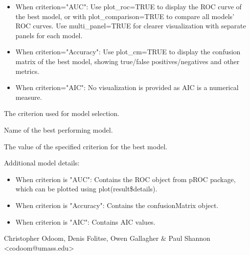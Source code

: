 \documentclass[a4paper]{book}
\begin{document}
\begin{Details}
\begin{itemize}
\item{} When criterion="AUC": Use plot\_roc=TRUE to display the ROC curve of the best model,
or with plot\_comparison=TRUE to compare all models' ROC curves.
Use multi\_panel=TRUE for clearer visualization with separate panels for each model.
\item{} When criterion="Accuracy": Use plot\_cm=TRUE to display the confusion matrix
of the best model, showing true/false positives/negatives and other metrics.
\item{} When criterion="AIC": No visualization is provided as AIC is a numerical measure.

\end{itemize}


\end{Details}
%
\begin{Value}
\begin{ldescription}
\item[\code{criterion}] The criterion used for model selection.
\item[\code{best\_model\_name}] Name of the best performing model.
\item[\code{performance\_metric}] The value of the specified criterion for the best model.
\item[\code{details}] Additional model details:
\begin{itemize}

\item{} When criterion is "AUC": Contains the ROC object from pROC package, which can be plotted using plot(result\$details).
\item{} When criterion is "Accuracy": Contains the confusionMatrix object.
\item{} When criterion is "AIC": Contains AIC values.

\end{itemize}


\end{ldescription}
\end{Value}
%
\begin{Author}
Christopher Odoom, Denis Folitse, Owen Gallagher \& Paul Shannon <codoom@umass.edu>
\end{Author}
%
\end{document}
